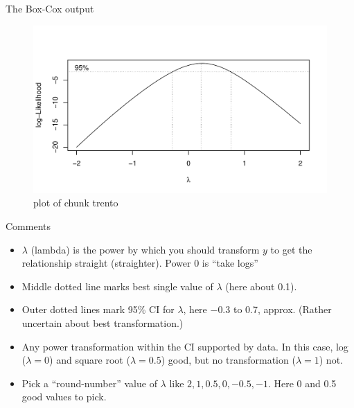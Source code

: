 \documentclass[ignorenonframetext,]{beamer}
\begin{document}
\begin{frame}{The Box-Cox output}
\protect\hypertarget{the-box-cox-output}{}

\begin{figure}
\centering
\includegraphics{figure/trento-1.pdf}
\caption{plot of chunk trento}
\end{figure}

\end{frame}

\begin{frame}{Comments}
\protect\hypertarget{comments-3}{}

\begin{itemize}
\item
  \(\lambda\) (lambda) is the power by which you should transform \(y\)
  to get the relationship straight (straighter). Power 0 is ``take
  logs''
\item
  Middle dotted line marks best single value of \(\lambda\) (here about
  0.1).
\item
  Outer dotted lines mark 95\% CI for \(\lambda\), here \(-0.3\) to 0.7,
  approx. (Rather uncertain about best transformation.)
\item
  Any power transformation within the CI supported by data. In this
  case, log (\(\lambda=0\)) and square root (\(\lambda=0.5\)) good, but
  no transformation (\(\lambda=1\)) not.
\item
  Pick a ``round-number'' value of \(\lambda\) like
  \(2,1,0.5,0,-0.5,-1\). Here 0 and 0.5 good values to pick.
\end{itemize}

\end{frame}
\end{document}
